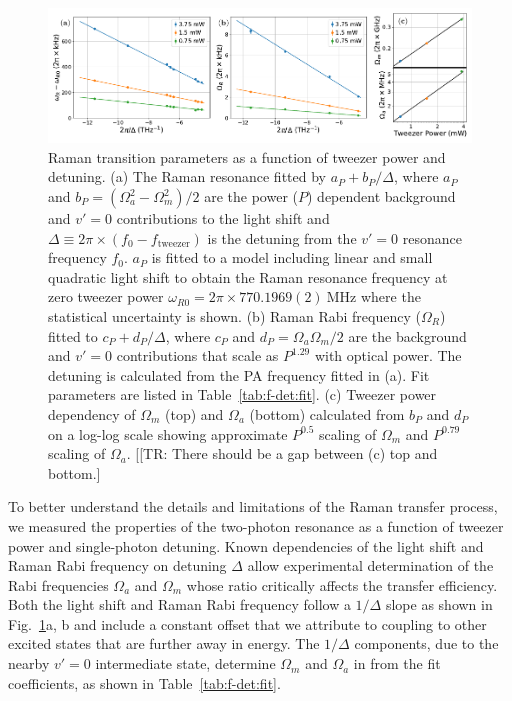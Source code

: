 \documentclass[aps,prl,twocolumn,10pt,superscriptaddress]{revtex4-1}
\newcommand{\paren}[1]{{\left({#1}\right)}}
\newcommand{\todo}[1]{}
\begin{document}
\begin{figure}
  \includegraphics[width=\textwidth]{imgs/fig-det.pdf}
  \caption{Raman transition parameters as a function of tweezer power and detuning.
    (a) The Raman resonance fitted by $a_P+b_P/\Delta$, where
    $a_P$ and $b_P=(\Omega_a^2-\Omega_m^2)/2$
    are the power ($P$) dependent background and $v'=0$ contributions
    to the light shift and
    $\Delta\equiv2\pi\times\paren{f_0 - f_{\mathrm{tweezer}}}$ is the detuning from
    the $v'=0$ resonance frequency $f_0$.
    $a_P$ is fitted to a model including linear and small quadratic light shift
    \todo{which assumes $\Omega_m\gg\Omega_a$} to obtain the Raman resonance frequency
    at zero tweezer power $\omega_{R0}=2\pi\times770.1969(2)~\mathrm{MHz}$ where the statistical uncertainty is shown.
    (b) Raman Rabi frequency ($\Omega_R$) fitted to $c_P+d_P/\Delta$, where
    $c_P$ and $d_P=\Omega_a\Omega_m/2$
    are the background and $v'=0$ contributions that scale as $P^{1.29}$ with optical power.
    The detuning is calculated from the PA frequency fitted in (a). Fit parameters are listed in Table~\ref{tab:f-det:fit}.
    (c) Tweezer power dependency of $\Omega_m$ (top) and $\Omega_a$ (bottom) calculated from
    $b_P$ and $d_P$ on a log-log scale showing approximate $P^{0.5}$ scaling of $\Omega_m$ and
    $P^{0.79}$ scaling of $\Omega_a$. [[TR: There should be a gap between (c) top and bottom.]
    \label{f-det}}
\end{figure}

To better understand the details and limitations of the Raman transfer process, we measured the properties of the two-photon resonance as a function of tweezer power and single-photon detuning.
Known dependencies of the light shift and Raman Rabi frequency on detuning $\Delta$ allow experimental determination of the Rabi frequencies
$ \Omega_a $ and $\Omega_m$ whose ratio critically affects the transfer efficiency.
Both the light shift and Raman Rabi frequency follow a $1/\Delta$ slope as shown in Fig.~\ref{f-det}a, b and include a constant offset that we attribute to coupling to other excited states that are further away in energy.
The $1/\Delta$ components, due to the nearby $v'=0$ intermediate state, determine $\Omega_m $ and $ \Omega_a $ in from the fit coefficients, as shown in Table~\ref{tab:f-det:fit}.
\end{document}
